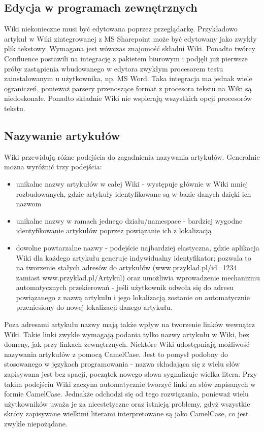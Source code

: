 \documentclass{article}
\begin{document}
	\subsection{Edycja w programach zewnętrznych}

Wiki niekonieczne musi być edytowana poprzez przeglądarkę. Przykładowo artykuł w Wiki zintegrowanej z MS Sharepoint może być edytowany jako zwykły plik tekstowy. Wymagana jest wówczas znajomość składni Wiki. Ponadto twórcy Confluence postawili na integrację z pakietem biurowym i podjęli już pierwsze próby zastąpienia wbudowanego w edytora zwykłym procesorem testu zainstalowanym u użytkownika, np. MS Word. Taka integracja ma jednak wiele ograniczeń, ponieważ parsery przenoszące format z procesora tekstu na Wiki są niedoskonałe. Ponadto składnie Wiki nie wspierają wszystkich opcji procesorów tekstu. 



	\subsection{Nazywanie artykułów}

Wiki przewidują różne podejścia do zagadnienia nazywania artykułów. Generalnie można wyróżnić trzy podejścia:
\begin{itemize}
\item unikalne nazwy artykułów w całej Wiki - występuje głównie w Wiki mniej rozbudowanych, gdzie artykuły identyfikowane są w bazie danych dzięki ich nazwom
\item unikalne nazwy w ramach jednego działu/namespace - bardziej wygodne identyfikowanie artykułów poprzez powiązanie ich z lokalizacją
\item dowolne powtarzalne nazwy - podejście najbardziej elastyczna, gdzie aplikacja Wiki dla każdego artykułu generuje indywidualny identyfikator; pozwala to na tworzenie stałych adresów do artykułów (www.przyklad.pl/id=1234 zamiast www.przyklad.pl/Artykul) oraz umożliwia wprowadzenie mechanizmu automatycznych przekierowań - jeśli użytkownik odwoła się do adresu powiązanego z nazwą artykułu i jego lokalizacją zostanie on automatycznie przeniesiony do nowej lokalizacji danego artykułu. 
\end{itemize}

Poza adresami artykułu nazwy mają także wpływ na tworzenie linków wewnątrz Wiki. Takie linki zwykle wymagają podania tylko nazwy artykułu w Wiki, bez domeny, jak przy linkach zewnętrznych. Niektóre Wiki udostępniają możliwość nazywania artykułów z pomocą CamelCase. Jest to pomysł podobny do stosowanego w językach programowania - nazwa składająca się z wielu słów zapisywana jest bez spacji, początek nowego słowa sygnalizuje wielka litera. Przy takim podejściu Wiki zaczyna automatycznie tworzyć linki za słów zapisanych w formie CamelCase. Jednakże odchodzi się od tego rozwiązania, ponieważ wielu użytkowników uważa je za nieestetyczne oraz istnieją problemy, gdyż wszystkie skróty zapisywane wielkimi literami interpretowane są jako CamelCase, co jest zwykle niepożądane.
\end{document}
